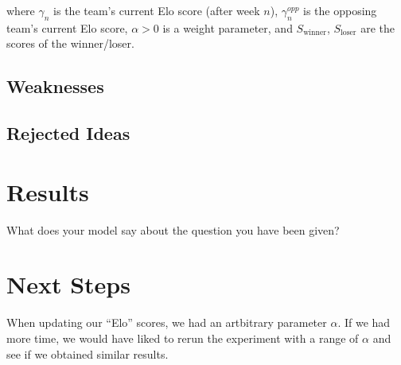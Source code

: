 \documentclass{article}
\begin{document}
where $\gamma_n$ is the team's current Elo score (after week $n$), $\gamma^{opp}_n$ is the opposing team's current Elo score, $\alpha > 0$ is a weight parameter, and $S_{\text{winner}}$, $S_{\text{loser}}$ are the scores of the winner/loser.
\subsection{Weaknesses}

\subsection{Rejected Ideas}

\section{Results}
What does your model say about the question you have been given?

\section{Next Steps}
When updating our ``Elo'' scores, we had an artbitrary parameter $\alpha$. If we had more time, we would have liked to rerun the experiment with a range of $\alpha$ and see if we obtained similar results.



\end{document}
